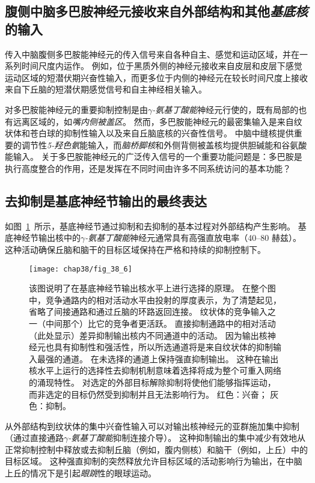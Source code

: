 \subsection{腹侧中脑多巴胺神经元接收来自外部结构和其他\textit{基底核}的输入}

传入中脑腹侧多巴胺能神经元的传入信号来自各种自主、感觉和运动区域，并在一系列时间尺度内运作。
例如，位于黑质外侧的神经元接收来自皮层和皮层下感觉运动区域的短潜伏期兴奋性输入，而更多位于内侧的神经元在较长时间尺度上接收来自下丘脑的短潜伏期感觉信号和自主神经相关输入。


对多巴胺能神经元的重要抑制控制是由\textit{$\gamma$-氨基丁酸能}神经元行使的，既有局部的也有远离区域的，如\textit{嘴内侧被盖区}。
然而，多巴胺能神经元的最密集输入是来自纹状体和苍白球的抑制性输入以及来自丘脑底核的兴奋性信号。
中脑中缝核提供重要的调节性\textit{5-羟色氨}能输入，而\textit{脑桥脚核}和外侧背侧被盖核均提供胆碱能和谷氨酸能输入。
关于多巴胺能神经元的广泛传入信号的一个重要功能问题是：多巴胺是执行高度整合的作用，还是发挥在不同时间由许多不同系统访问的基本功能？



\subsection{去抑制是基底神经节输出的最终表达}

如图~\ref{fig:38_6}~所示，基底神经节通过抑制和去抑制的基本过程对外部结构产生影响。
基底神经节输出核中的\textit{$\gamma$-氨基丁酸能}神经元通常具有高强直放电率（40–80 赫兹）。
这种活动确保丘脑和脑干的目标区域保持在严格和持续的抑制控制下。


\begin{figure}[htbp]
	\centering
	\texttt{[image: chap38/fig\_38\_6]}
	\caption{该图说明了在基底神经节输出核水平上进行选择的原理。
		在整个图中，竞争通路内的相对活动水平由投射的厚度表示，为了清楚起见，省略了间接通路和通过丘脑的环路返回连接。
		纹状体的竞争输入之一（中间那个）比它的竞争者更活跃。
		直接抑制通路中的相对活动（此处显示）差异抑制输出核内不同通道中的活动。
		因为输出核神经元也具有抑制性和强活性，所以所选通道将是来自纹状体的抑制输入最强的通道。
		在未选择的通道上保持强直抑制输出。
		这种在输出核水平上运行的选择性去抑制机制意味着选择将成为整个可重入网络的涌现特性。
		对选定的外部目标解除抑制将使他们能够指挥运动，而非选定的目标仍然受到抑制并且无法影响行为。
        红色：兴奋； 灰色：抑制。}
	\label{fig:38_6}
\end{figure}


从外部结构到纹状体的集中兴奋性输入可以对输出核神经元的亚群施加集中抑制（通过直接通路\textit{$\gamma$-氨基丁酸能}抑制连接介导）。
这种抑制输出的集中减少有效地从正常抑制控制中释放或去抑制丘脑（例如，腹内侧核）和脑干（例如，上丘）中的目标区域。
这种强直抑制的突然释放允许目标区域的活动影响行为输出，在中脑上丘的情况下是引起\textit{眼跳}性的眼球运动。


